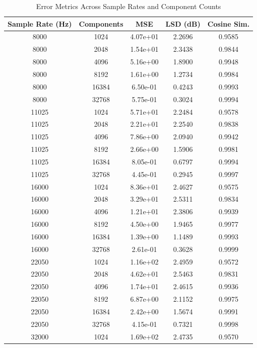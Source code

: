 \begin{table}[htbp]
\centering
\caption{Error Metrics Across Sample Rates and Component Counts}
\begin{tabular}{|c|c|c|c|c|}
\hline
Sample Rate (Hz) & Components & MSE & LSD (dB) & Cosine Sim. \\ \hline
8000 & 1024 & 4.07e+01 & 2.2696 & 0.9585 \\ \hline
8000 & 2048 & 1.54e+01 & 2.3438 & 0.9844 \\ \hline
8000 & 4096 & 5.16e+00 & 1.8900 & 0.9948 \\ \hline
8000 & 8192 & 1.61e+00 & 1.2734 & 0.9984 \\ \hline
8000 & 16384 & 6.50e-01 & 0.4243 & 0.9993 \\ \hline
8000 & 32768 & 5.75e-01 & 0.3024 & 0.9994 \\ \hline
11025 & 1024 & 5.71e+01 & 2.2484 & 0.9578 \\ \hline
11025 & 2048 & 2.21e+01 & 2.2540 & 0.9838 \\ \hline
11025 & 4096 & 7.86e+00 & 2.0940 & 0.9942 \\ \hline
11025 & 8192 & 2.66e+00 & 1.5906 & 0.9981 \\ \hline
11025 & 16384 & 8.05e-01 & 0.6797 & 0.9994 \\ \hline
11025 & 32768 & 4.45e-01 & 0.2945 & 0.9997 \\ \hline
16000 & 1024 & 8.36e+01 & 2.4627 & 0.9575 \\ \hline
16000 & 2048 & 3.29e+01 & 2.5311 & 0.9834 \\ \hline
16000 & 4096 & 1.21e+01 & 2.3806 & 0.9939 \\ \hline
16000 & 8192 & 4.50e+00 & 1.9465 & 0.9977 \\ \hline
16000 & 16384 & 1.39e+00 & 1.1489 & 0.9993 \\ \hline
16000 & 32768 & 2.61e-01 & 0.3628 & 0.9999 \\ \hline
22050 & 1024 & 1.16e+02 & 2.4959 & 0.9572 \\ \hline
22050 & 2048 & 4.62e+01 & 2.5463 & 0.9831 \\ \hline
22050 & 4096 & 1.74e+01 & 2.4615 & 0.9936 \\ \hline
22050 & 8192 & 6.87e+00 & 2.1152 & 0.9975 \\ \hline
22050 & 16384 & 2.42e+00 & 1.5674 & 0.9991 \\ \hline
22050 & 32768 & 4.15e-01 & 0.7321 & 0.9998 \\ \hline
32000 & 1024 & 1.69e+02 & 2.4735 & 0.9570 \\ \hline

\end{tabular}
\end{table}
